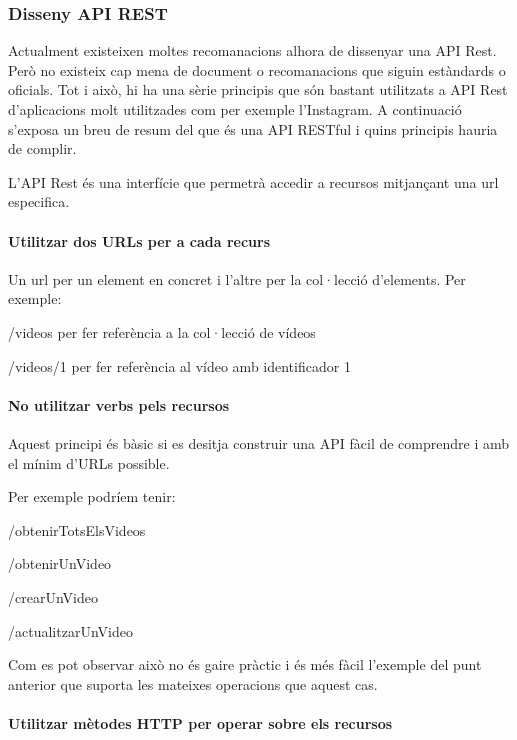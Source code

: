 \documentclass[12pt, titlepage]{article}
\begin{document}
\clearpage

\subsubsection{Disseny API REST}

Actualment existeixen moltes recomanacions alhora de dissenyar una API Rest. Però
no existeix cap mena de document o recomanacions que siguin estàndards o oficials.
Tot i això, hi ha una sèrie principis que són bastant utilitzats a API Rest d’aplicacions
molt utilitzades com per exemple l’Instagram. A continuació s’exposa un breu de
resum del que és una API RESTful i quins principis hauria de complir.

L’API Rest és una interfície que permetrà accedir a recursos mitjançant una url
especifica.

\paragraph{Utilitzar dos URLs per a cada recurs}

 Un url per un element en concret i l’altre per la col·lecció d’elements. Per exemple:

/videos \textrightarrow per fer referència a la col·lecció de vídeos

/videos/1 \textrightarrow per fer referència al vídeo amb identificador 1

\paragraph{No utilitzar verbs pels recursos}

Aquest principi és bàsic si es desitja construir una API fàcil de comprendre i
amb el mínim d’URLs possible.

Per exemple podríem tenir:

/obtenirTotsElsVideos

/obtenirUnVideo

/crearUnVideo

/actualitzarUnVideo

Com es pot observar això no és gaire pràctic i és més fàcil l’exemple del punt
anterior que suporta les mateixes operacions que aquest cas.

\paragraph{Utilitzar mètodes HTTP per operar sobre els recursos}
\end{document}
